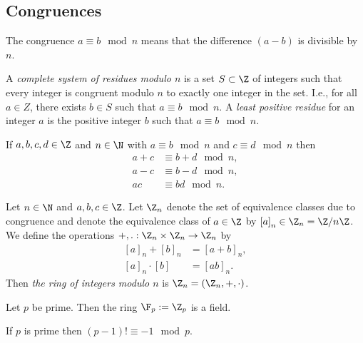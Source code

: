 \documentclass{article}
\begin{document}
\subsection{Congruences}

\begin{definition}[Congruence]
	The congruence $a\equiv b\mod n$ means that the difference $(a-b)$ is
	divisible by $n$.
\end{definition}

\begin{definition}
	A \emph{complete system of residues modulo $n$} is a set $S\subset\Z$ of integers
	such that every integer is congruent modulo $n$ to exactly one integer
	in the set. I.e., for all $a\in Z$, there exists $b\in S$ such that $a\equiv b\mod n$.
	A \emph{least positive residue} for an integer $a$ is the
	positive integer $b$ such that $a\equiv b \mod n$.
\end{definition}

\begin{theorem}[Lecture 4]
	If $a,b,c,d\in\Z$ and $n\in\N$ with $a\equiv b\mod n$ and $c\equiv d\mod n$
	then
	\begin{align*}
		a+c & \equiv b+d \mod n, \\
		a-c & \equiv b-d \mod n, \\
		ac  & \equiv bd  \mod n.
	\end{align*}
\end{theorem}

\begin{definition}
	Let $n\in\N$ and $a,b,c\in\Z$. Let $\Z_n$ denote the set of equivalence
	classes due to congruence and denote the equivalence class of $a\in\Z$ by
	$\left[a\right]_n\in\Z_n=\Z/n\Z$. We define the operations $+,.:\Z_n\times\Z_n\to\Z_n$
	by
	\begin{align*}
		\left[a\right]_n +     \left[b\right]_n & = \left[a+b\right]_n, \\
		\left[a\right]_n \cdot \left[b\right]   & = \left[ab\right]_n.
	\end{align*}
	Then \emph{the ring of integers modulo $n$} is $\Z_n=(\Z_n,+,\cdot)$.
\end{definition}

\begin{lemma}[Lecture 4]
	Let $p$ be prime. Then the ring $\F_p:=\Z_p$ is a field.
\end{lemma}

\begin{theorem}
	If $p$ is prime then $(p-1)!\equiv -1 \mod p$.
\end{theorem}
\end{document}
